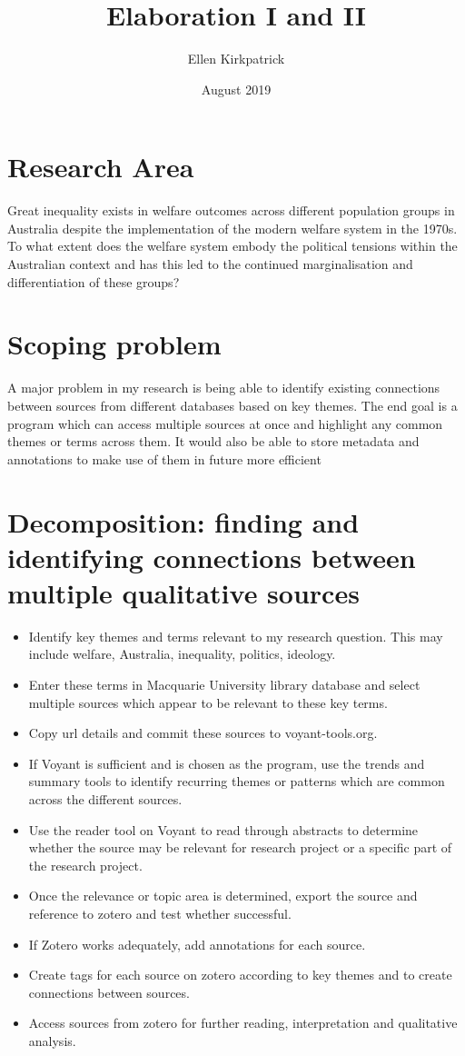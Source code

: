 \documentclass{article}
\title{Elaboration I and II}
\author{Ellen Kirkpatrick }
\date{August 2019}
\begin{document}
\maketitle
\section{Research Area}
Great inequality exists in welfare outcomes across different population groups in Australia despite the implementation of the modern welfare system in the 1970s. To what extent does the welfare system embody the political tensions within the Australian context and has this led to the continued marginalisation and differentiation of these groups?

\section{Scoping problem}
A major problem in my research is being able to identify existing connections between sources from different databases based on key themes. The end goal is a program which can access multiple sources at once and highlight any common themes or terms across them. It would also be able to store metadata and annotations to make use of them in future more efficient

\section{Decomposition: finding and identifying connections between multiple qualitative sources}
\begin{itemize}
    \item Identify key themes and terms relevant to my research question. This may include welfare, Australia, inequality, politics, ideology.
    \item Enter these terms in Macquarie University library database and select multiple sources which appear to be relevant to these key terms. 
    \item Copy url details and commit these sources to  voyant-tools.org. 
    \item If Voyant is sufficient and is chosen as the program, use the trends and summary tools to identify recurring themes or patterns which are common across the different sources. 
    \item Use the reader tool on Voyant to read through abstracts to determine whether the source may be relevant for research project or a specific part of the research project.
    \item Once the relevance or topic area is determined, export the source and reference to zotero and test whether successful. 
    \item If Zotero works adequately, add annotations for each source.
    \item Create tags for each source on zotero according to key themes and to create connections between sources.
    \item Access sources from zotero for further reading, interpretation and qualitative analysis. 
\end{itemize}
\end{document}
